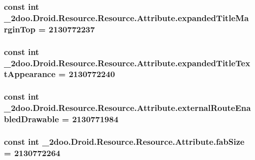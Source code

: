 \hypertarget{class__2doo_1_1_droid_1_1_resource_1_1_attribute_98b70823b487deacbfbb5173ae1753a1}{
\subsubsection[{expandedTitleMarginTop}]{\setlength{\rightskip}{0pt plus 5cm}const int \_\-2doo.Droid.Resource.Resource.Attribute.expandedTitleMarginTop = 2130772237}}
\label{class__2doo_1_1_droid_1_1_resource_1_1_attribute_98b70823b487deacbfbb5173ae1753a1}


\hypertarget{class__2doo_1_1_droid_1_1_resource_1_1_attribute_21e0aaa8a3bf820c844f683fe54e8208}{
\subsubsection[{expandedTitleTextAppearance}]{\setlength{\rightskip}{0pt plus 5cm}const int \_\-2doo.Droid.Resource.Resource.Attribute.expandedTitleTextAppearance = 2130772240}}
\label{class__2doo_1_1_droid_1_1_resource_1_1_attribute_21e0aaa8a3bf820c844f683fe54e8208}


\hypertarget{class__2doo_1_1_droid_1_1_resource_1_1_attribute_187cdf9d6b5eb2890137fe6797436132}{
\subsubsection[{externalRouteEnabledDrawable}]{\setlength{\rightskip}{0pt plus 5cm}const int \_\-2doo.Droid.Resource.Resource.Attribute.externalRouteEnabledDrawable = 2130771984}}
\label{class__2doo_1_1_droid_1_1_resource_1_1_attribute_187cdf9d6b5eb2890137fe6797436132}


\hypertarget{class__2doo_1_1_droid_1_1_resource_1_1_attribute_52413d18999c6dd224d5d6ade41d899b}{
\subsubsection[{fabSize}]{\setlength{\rightskip}{0pt plus 5cm}const int \_\-2doo.Droid.Resource.Resource.Attribute.fabSize = 2130772264}}
\label{class__2doo_1_1_droid_1_1_resource_1_1_attribute_52413d18999c6dd224d5d6ade41d899b}


